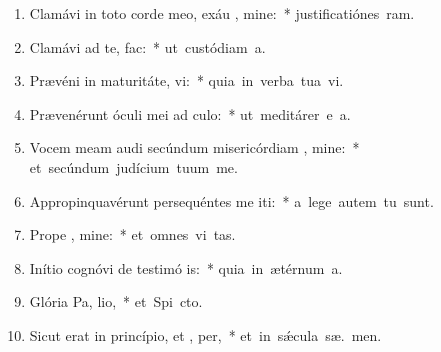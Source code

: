 \begin{flushleft}
\begin{enumerate}[leftmargin=*]


\item Clamávi in toto corde meo, exáu , mine:~* \mbox{justificatiónes  ram.}
\item Clamávi ad te,   fac:~* \mbox{ut custódiam  a.}
\item Prævéni in maturitáte,  vi:~* \mbox{quia in verba tua vi.}
\item Prævenérunt óculi mei ad  culo:~* \mbox{ut meditárer e a.}
\item Vocem meam audi secúndum misericórdiam , mine:~* \mbox{et secúndum judícium tuum  me.}
\item Appropinquavérunt persequéntes me iti:~* \mbox{a lege autem tu   sunt.}
\item Prope  , mine:~* \mbox{et omnes vi  tas.}
\item Inítio cognóvi de testimó is:~* \mbox{quia in ætérnum  a.}
\item Glória Pa,  lio,~* \mbox{et Spi cto.}
\item Sicut erat in princípio, et ,  per,~* \mbox{et in s\'{\ae}cula sæ. men.}




\end{enumerate}
\end{flushleft}

